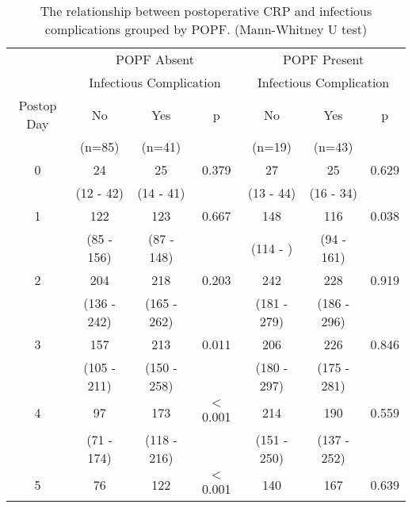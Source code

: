 \begin{table}[h]
	\centering
	\caption{The relationship between postoperative CRP and infectious complications grouped by POPF. (Mann-Whitney U test)}
	\label{table:crp_comp_vs_infections_popf_y1n0}
	\begin{tabular}{| c | c c c | c c c |}
		\hline
		           &       \multicolumn{3}{c}{POPF Absent}       &      \multicolumn{3}{c}{POPF Present}       \\
		           & \multicolumn{3}{c}{Infectious Complication} & \multicolumn{3}{c}{Infectious Complication} \\
		Postop Day & No          & Yes         & p               & No          & Yes         & p               \\
		           & (n=85)      & (n=41)      &                 & (n=19)      & (n=43)      &  \\ \hline
		0          & 24          & 25          & 0.379           & 27          & 25          & 0.629           \\
		           & (12 - 42)   & (14 - 41)   &                 & (13 - 44)   & (16 - 34)   &  \\
		1          & 122         & 123         & 0.667           & 148         & 116         & 0.038           \\
		           & (85 - 156)  & (87 - 148)  &                 & (114 - )    & (94 - 161)  &  \\
		2          & 204         & 218         & 0.203           & 242         & 228         & 0.919           \\
		           & (136 - 242) & (165 - 262) &                 & (181 - 279) & (186 - 296) &  \\
		3          & 157         & 213         & 0.011           & 206         & 226         & 0.846           \\
		           & (105 - 211) & (150 - 258) &                 & (180 - 297) & (175 - 281) &  \\
		4          & 97          & 173         & $<$0.001        & 214         & 190         & 0.559           \\
		           & (71 - 174)  & (118 - 216) &                 & (151 - 250) & (137 - 252) &  \\
		5          & 76          & 122         & $<$0.001        & 140         & 167         & 0.639           \\

\end{tabular}
\end{table}

